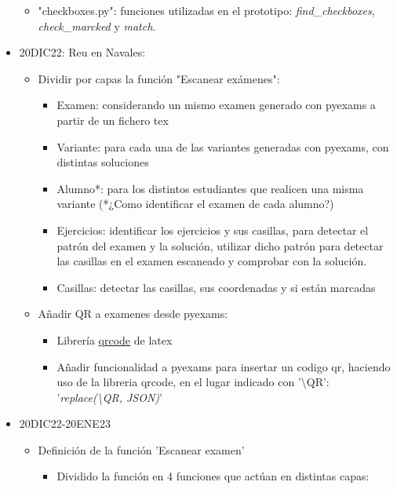 \begin{itemize}
\begin{itemize}
        \item "checkboxes.py": funciones utilizadas en el prototipo: \textit{find\_checkboxes}, \textit{check\_marcked} y \textit{match}.
    \end{itemize}
    \item 20DIC22: Reu en Navales:
    \begin{itemize}
        \item Dividir por capas la función "Escanear exámenes":
        \begin{itemize}
            \item Examen: considerando un mismo examen generado con pyexams a partir de un fichero tex
            \item Variante: para cada una de las variantes generadas con pyexams, con distintas soluciones
            \item Alumno*: para los distintos estudiantes que realicen una misma variante (*¿Como identificar el examen de cada alumno?)
            \item Ejercicios: identificar los ejercicios y sus casillas, para detectar el patrón del examen y la solución, utilizar dicho patrón para detectar las casillas en el examen escaneado y comprobar con la solución.
            \item Casillas: detectar las casillas, sus coordenadas y si están marcadas
        \end{itemize}
        \item Añadir QR a examenes desde pyexams:
        \begin{itemize}
            \item Librería \href{https://ctan.org/pkg/qrcode?lang=en}{qrcode} de latex 
            \item Añadir funcionalidad a pyexams para insertar un codigo qr, haciendo uso de la libreria qrcode, en el lugar indicado con '\textbackslash{}QR': '\textit{replace(\textbackslash{}QR, JSON)}'
        \end{itemize}
    \end{itemize}
    \item 20DIC22-20ENE23
    \begin{itemize}
        \item Definición de la función 'Escanear examen'
        \begin{itemize}
            \item Dividido la función en 4 funciones que actúan en distintas capas:
            \begin{figure}
                \centering

\end{figure}
\end{itemize}
\end{itemize}
\end{itemize}
